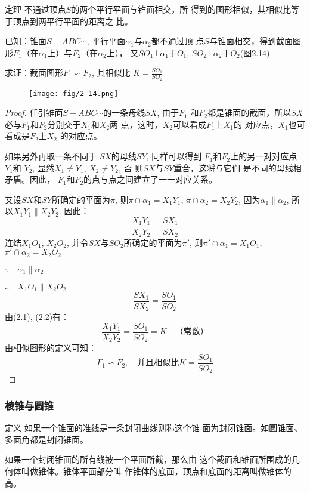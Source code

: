 \begin{blk}
    {定理} 不通过顶点$S$的两个平行平面与锥面相交，所
    得到的图形相似，其相似比等于顶点到两平行平面的距离之
    比。
\end{blk}

已知：锥面$S-ABC\cdots$, 平行平面$\alpha_1$与$\alpha_2$都不通过顶
点$S$与锥面相交，得到截面图形$F_1$（在$\alpha_1$上）与$F_2$（在$\alpha_2$上），
又$SO_1\bot\alpha_1$于$O_1$, $SO_2\bot\alpha_2$于$O_2$(图2.14)

求证：截面图形$F_1\backsim F_2$, 其相似比
$K=\frac{SO_1}{SO_2}$

\begin{figure}[htp]
    \centering
\texttt{[image: fig/2-14.png]}
    \caption{}
\end{figure}

\begin{proof}
任引锥面$S-ABC\cdots$的一条母线$SX$, 由于$F_1$
和$F_2$都是锥面的截面，所以$SX$
必与$F_1$和$F_2$分别交于$X_1$和$X_2$两
点，这时，$X_2$可以看成$F_1$上$X_1$的
对应点，$X_1$也可看成是$F_2$上$X_2$
的对应点。

如果另外再取一条不同于
$SX$的母线$SY$, 同样可以得到
$F_1$和$F_2$上的另一对对应点$Y_1$和
$Y_2$, 显然$X_1\ne Y_1$, $X_2\ne Y_2$, 否
则$SX$与$SY$重合，这将与它们
是不同的母线相矛盾。因此，
$F_1$和$F_2$的点与点之间建立了一一对应关系。

又设$SX$和$SY$所确定的平面为$\pi$, 则$\pi\cap \alpha_1=X_1Y_1$,
$\pi\cap \alpha_2=X_2Y_2$, 因为$\alpha_1\parallel \alpha_2$, 所以$X_1Y_1\parallel X_2Y_2$. 因此：
\begin{equation}
    \frac{X_1Y_1}{X_2Y_2}=\frac{SX_1}{SX_2}
\end{equation}
连结$X_1O_1$, $X_2O_2$, 并令$SX$与$SO_2$所确定的平面为$\pi'$, 
则$\pi'\cap\alpha_1=X_1O_1$, $\pi'\cap\alpha_2=X_2O_2$

$\because\quad \alpha_1\parallel \alpha_2$

$\therefore\quad X_1O_1\parallel X_2O_2$
\begin{equation}
    \frac{SX_1}{SX_2}=\frac{SO_1}{SO_2}
\end{equation}
由(2.1), (2.2)有：
\[\frac{X_1Y_1}{X_2Y_2}=\frac{SO_1}{SO_2}=K\quad\text{（常数）}\]
由相似图形的定义可知：
\[F_1\backsim F_2,\quad \text{并且相似比}K=\frac{SO_1}{SO_2}\]
\end{proof}

\subsubsection{棱锥与圆锥}
\begin{blk}
   {定义} 如果一个锥面的准线是一条封闭曲线则称这个锥
面为封闭锥面。如圆锥面、多面角都是封闭锥面。

如果一个封闭锥面的所有线被一个平面所截，那么由
这个截面和锥面所围成的几何体叫做锥体。锥体平面部分叫
作锥体的底面，顶点和底面的距离叫做锥体的高。 
\end{blk}

